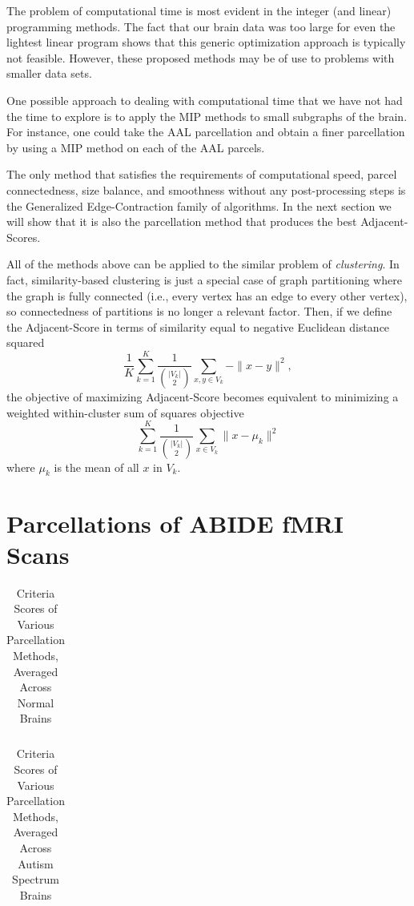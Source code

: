 The problem of computational time is most evident in the integer (and
linear) programming methods. The fact that our brain data was too large
for even the lightest linear program shows that this generic
optimization approach is typically not feasible. However, these
proposed methods may be of use to problems with smaller data sets.

One possible approach to dealing with computational time that we have
not had the time to explore is to apply the MIP methods to small
subgraphs of the brain. For instance, one could take the AAL
parcellation and obtain a finer parcellation by using a MIP method on
each of the AAL parcels.

The only method that satisfies the requirements of computational speed,
parcel connectedness, size balance, and smoothness without any
post-processing steps is the Generalized Edge-Contraction family of
algorithms. In the next section we will show that it is also the
parcellation method that produces the best Adjacent-Scores.

All of the methods above can be applied to the similar problem of
\textit{clustering}. In fact, similarity-based clustering is just a
special case of graph partitioning where the graph is fully connected
(i.e., every vertex has an edge to every other vertex), so connectedness
of partitions is no longer a relevant factor. Then, if we define the
Adjacent-Score in terms of similarity equal to negative Euclidean
distance squared
\[ \frac{1}{K}\sum_{k=1}^K \frac{1}{{|V_k| \choose 2}}
   \sum_{x,y \in V_k} - \|x - y\|^2, \]
the objective of maximizing Adjacent-Score becomes equivalent to 
minimizing a weighted within-cluster sum of squares objective
\[ \sum_{k=1}^K \frac{1}{{|V_k| \choose 2}}
   \sum_{x \in V_k} \|x - \mu_k\|^2 \]
where $\mu_k$ is the mean of all $x$ in $V_k$.

\section{Parcellations of ABIDE fMRI Scans}

\begin{table}
\caption{Criteria Scores of Various Parcellation Methods, %
Averaged Across Normal Brains}
\label{normal}
\begin{tabular}{l | r r r r r r}

\end{tabular}
\end{table}

\begin{table}
\caption{Criteria Scores of Various Parcellation Methods, %
Averaged Across Autism Spectrum Brains}
\label{autism}
\begin{tabular}{l | r r r r r r}

\end{tabular}
\end{table}

